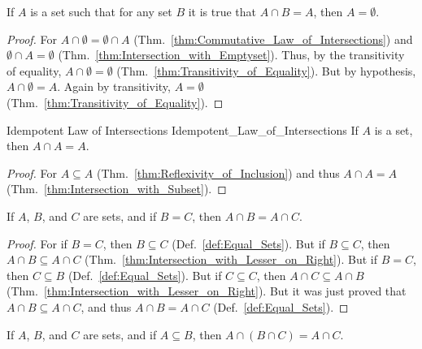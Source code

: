         \begin{theorem}
            \label{thm:Empty_Set_Is_Zero_for_Intersections}%
            If $A$ is a set such that for any set $B$ it is true that
            $A\cap{B}=A$, then $A=\emptyset$.
        \end{theorem}
        \begin{proof}
            For $A\cap\emptyset=\emptyset\cap{A}$
            (Thm.~\ref{thm:Commutative_Law_of_Intersections}) and
            $\emptyset\cap{A}=\emptyset$
            (Thm.~\ref{thm:Intersection_with_Emptyset}). Thus, by the
            transitivity of equality, $A\cap\emptyset=\emptyset$
            (Thm.~\ref{thm:Transitivity_of_Equality}). But by hypothesis,
            $A\cap\emptyset=A$. Again by transitivity, $A=\emptyset$
            (Thm.~\ref{thm:Transitivity_of_Equality}).
        \end{proof}
        \begin{ltheorem}{Idempotent Law of Intersections}
                        {Idempotent_Law_of_Intersections}
            If $A$ is a set, then $A\cap{A}=A$.
        \end{ltheorem}
        \begin{proof}
            For $A\subseteq{A}$ (Thm.~\ref{thm:Reflexivity_of_Inclusion}) and
            thus $A\cap{A}=A$ (Thm.~\ref{thm:Intersection_with_Subset}).
        \end{proof}
        \begin{theorem}
            \label{thm:Intersection_with_Equal_Sets}%
            If $A$, $B$, and $C$ are sets, and if $B=C$, then
            $A\cap{B}=A\cap{C}$.
        \end{theorem}
        \begin{proof}
            For if $B=C$, then $B\subseteq{C}$ (Def.~\ref{def:Equal_Sets}).
            But if $B\subseteq{C}$, then $A\cap{B}\subseteq{A}\cap{C}$
            (Thm.~\ref{thm:Intersection_with_Lesser_on_Right}). But if $B=C$,
            then $C\subseteq{B}$ (Def.~\ref{def:Equal_Sets}). But if
            $C\subseteq{C}$, then $A\cap{C}\subseteq{A}\cap{B}$
            (Thm.~\ref{thm:Intersection_with_Lesser_on_Right}). But it was just
            proved that $A\cap{B}\subseteq{A}\cap{C}$, and thus
            $A\cap{B}=A\cap{C}$ (Def.~\ref{def:Equal_Sets}).
        \end{proof}
        \begin{theorem}
            \label{thm:Lemma_1_for_Assoc_Law_of_Intersections}%
            If $A$, $B$, and $C$ are sets, and if $A\subseteq{B}$, then
            $A\cap(B\cap{C})=A\cap{C}$.
        \end{theorem}
